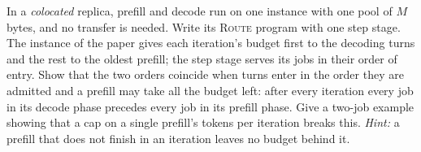 \begin{exercise}\label{L1:exr:colocated}
In a \emph{colocated} replica, prefill and decode run on one instance with one pool of
$M$ bytes, and no transfer is needed. Write its \textsc{Route} program with one step
stage. The instance of the paper gives each iteration's budget first to the decoding
turns and the rest to the oldest prefill; the step stage serves its jobs in their
order of entry. Show that the two orders coincide when turns enter in the order they
are admitted and a prefill may take all the budget left: after every iteration every
job in its decode phase precedes every job in its prefill phase. Give a two-job
example showing that a cap on a single prefill's tokens per iteration breaks this.
\emph{Hint:} a prefill that does not finish in an iteration leaves no budget behind it.
\end{exercise}
